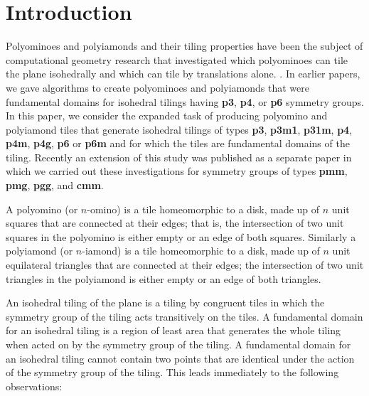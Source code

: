 \documentclass{ws-ijcga}
\begin{document}
\section{Introduction}	\label{intro}
Polyominoes and polyiamonds and their tiling properties have been the subject of 
computational geometry research that investigated 
which polyominoes can tile the plane isohedrally and 
which can tile by translations alone. \cite{rhoads,Kev}. 
In earlier papers\cite{fukuda2006,fukuda2008}, we gave algorithms to create polyominoes and
polyiamonds that were fundamental domains for isohedral tilings having {\bf p3}, {\bf p4}, or {\bf p6} symmetry
groups. 
In this paper, we consider the expanded task of producing polyomino and polyiamond
tiles that generate isohedral tilings of types {\bf p3}, {\bf p3m1}, {\bf p31m}, {\bf p4}, {\bf p4m}, {\bf p4g}, {\bf p6} 
or {\bf p6m} and for
which the tiles are fundamental domains of the tiling.
Recently an extension of this study was published as a separate paper\cite{fukuda2011} 
in which we carried out these investigations for symmetry groups of
types {\bf pmm}, {\bf pmg}, {\bf pgg}, and {\bf cmm}.


A polyomino (or $n$-omino) is a tile homeomorphic to a disk, made up of $n$ unit squares that
are connected at their edges; that is, the intersection of two unit squares in the polyomino is
either empty or an edge of both squares. 
Similarly a polyiamond (or $n$-iamond) is a tile
homeomorphic to a disk, made up of $n$ unit equilateral triangles that are connected at their edges;
the intersection of two unit triangles in the polyiamond is either empty or an edge of both
triangles.

An isohedral tiling of the plane is a tiling by congruent tiles in which the symmetry group of
the tiling acts transitively on the tiles. A fundamental domain for an isohedral tiling is a region
of least area that generates the whole tiling when acted on by the symmetry group of the tiling.
A fundamental domain for an isohedral tiling cannot contain two points that are identical under
the action of the symmetry group of the tiling. 
This leads immediately to the following observations:
\end{document}
